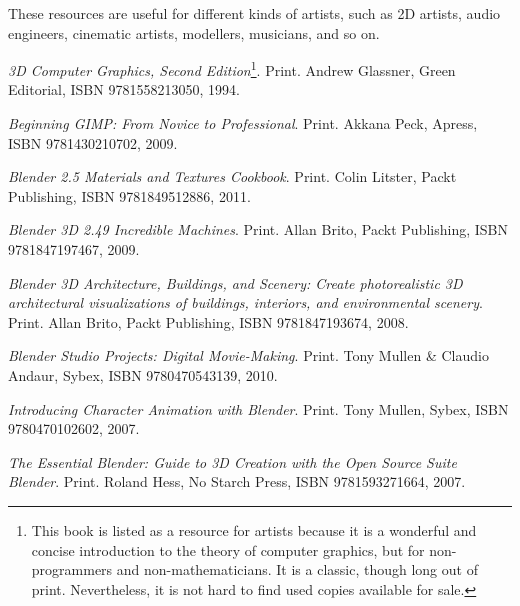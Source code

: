 
These resources are useful for different kinds of artists, such as 2D artists, audio engineers, cinematic artists, modellers, musicians, and so on.

\startitemize[4]
\item
{\it 3D Computer Graphics, Second Edition}\footnote{This book is listed as a resource for artists because it is a wonderful and concise introduction to the theory of computer graphics, but for non-programmers and non-mathematicians. It is a classic, though long out of print. Nevertheless, it is not hard to find used copies available for sale.}. Print.\crlf
Andrew Glassner, Green Editorial, ISBN 9781558213050, 1994.

\item
{\it Beginning GIMP: From Novice to Professional}. Print.\crlf
Akkana Peck, Apress, ISBN 9781430210702, 2009.

\item
{\it Blender 2.5 Materials and Textures Cookbook}. Print.\crlf
Colin Litster, Packt Publishing, ISBN 9781849512886, 2011.

\item
{\it Blender 3D 2.49 Incredible Machines}. Print.\crlf
Allan Brito, Packt Publishing, ISBN 9781847197467, 2009.

\item
{\it Blender 3D Architecture, Buildings, and Scenery: Create photorealistic 3D architectural visualizations of buildings, interiors, and environmental scenery}. Print.\crlf
Allan Brito, Packt Publishing, ISBN 9781847193674, 2008.

\item
{\it Blender Studio Projects: Digital Movie-Making}. Print.\crlf
Tony Mullen & Claudio Andaur, Sybex, ISBN 9780470543139, 2010.

\item
{\it Introducing Character Animation with Blender}. Print.\crlf
Tony Mullen, Sybex, ISBN 9780470102602, 2007.

\item
{\it The Essential Blender: Guide to 3D Creation with the Open Source Suite Blender}. Print.\crlf
Roland Hess, No Starch Press, ISBN 9781593271664, 2007.
\stopitemize

